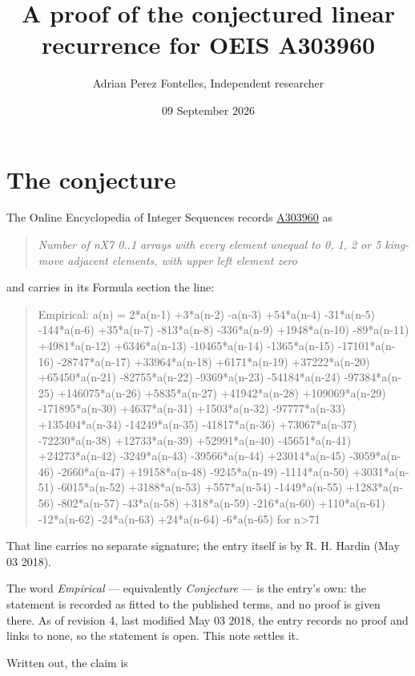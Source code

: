 \documentclass[11pt]{article}
\title{A proof of the conjectured linear recurrence for OEIS A303960}
\author{Adrian Perez Fontelles, Independent researcher}
\date{09 September 2026}
\theoremstyle{definition}
\begin{document}
\maketitle
\section{The conjecture}

The Online Encyclopedia of Integer Sequences records \href{https://oeis.org/A303960}{A303960} as

\begin{quote}\itshape Number of nX7 0..1 arrays with every element unequal to 0, 1, 2 or 5 king-move adjacent elements, with upper left element zero\end{quote}

and carries in its Formula section the line:

\begin{quote}\ttfamily Empirical: a(n) = 2*a(n-1) +3*a(n-2) -a(n-3) +54*a(n-4) -31*a(n-5) -144*a(n-6) +35*a(n-7) -813*a(n-8) -336*a(n-9) +1948*a(n-10) -89*a(n-11) +4981*a(n-12) +6346*a(n-13) -10465*a(n-14) -1365*a(n-15) -17101*a(n-16) -28747*a(n-17) +33964*a(n-18) +6171*a(n-19) +37222*a(n-20) +65450*a(n-21) -82755*a(n-22) -9369*a(n-23) -54184*a(n-24) -97384*a(n-25) +146075*a(n-26) +5835*a(n-27) +41942*a(n-28) +109069*a(n-29) -171895*a(n-30) +4637*a(n-31) +1503*a(n-32) -97777*a(n-33) +135404*a(n-34) -14249*a(n-35) -41817*a(n-36) +73067*a(n-37) -72230*a(n-38) +12733*a(n-39) +52991*a(n-40) -45651*a(n-41) +24273*a(n-42) -3249*a(n-43) -39566*a(n-44) +23014*a(n-45) -3059*a(n-46) -2660*a(n-47) +19158*a(n-48) -9245*a(n-49) -1114*a(n-50) +3031*a(n-51) -6015*a(n-52) +3188*a(n-53) +557*a(n-54) -1449*a(n-55) +1283*a(n-56) -802*a(n-57) -43*a(n-58) +318*a(n-59) -216*a(n-60) +110*a(n-61) -12*a(n-62) -24*a(n-63) +24*a(n-64) -6*a(n-65) for n>71\end{quote}

That line carries no separate signature; the entry itself is by R. H. Hardin (May 03 2018).

The word {\itshape Empirical} --- equivalently {\itshape Conjecture} --- is the entry's own: the statement is recorded as fitted to the published terms, and no proof is given there. As of revision 4, last modified May 03 2018, the entry records no proof and links to none, so the statement is open. This note settles it.

Written out, the claim is
\end{document}
